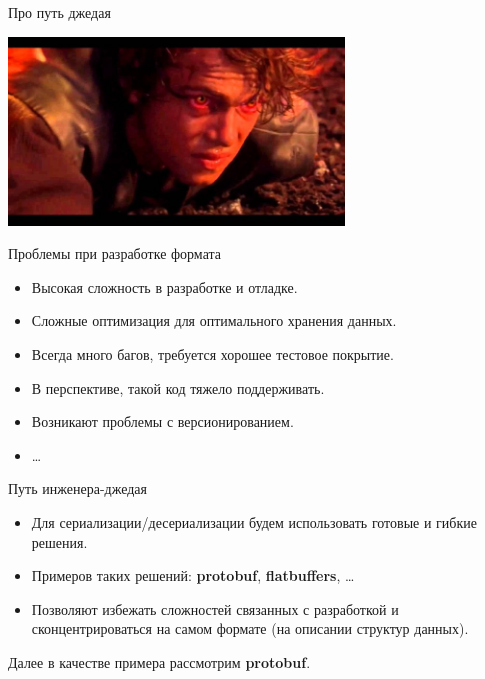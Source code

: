 \documentclass{beamer}
\begin{document}
\begin{frame}[fragile]{Про путь джедая}
    \begin{center}
        \includegraphics[height=50mm]{enaken.jpg}
    \end{center}
\end{frame}

\begin{frame}[fragile]{Проблемы при разработке формата}
    \begin{itemize}
        \item Высокая сложность в разработке и отладке.
        \item Сложные оптимизация для оптимального хранения данных.
        \item Всегда много багов, требуется хорошее тестовое покрытие.
        \item В перспективе, такой код тяжело поддерживать.
        \item Возникают проблемы с версионированием.
        \item \dots
    \end{itemize}
\end{frame}

\begin{frame}[fragile]{Путь инженера-джедая}
    \begin{itemize}
        \item Для сериализации/десериализации будем использовать готовые и гибкие решения.
        \item Примеров таких решений: {\bf protobuf}, {\bf flatbuffers}, \dots
        \item Позволяют избежать сложностей связанных с разработкой и сконцентрироваться на самом формате (на описании структур данных).
    \end{itemize}
    Далее в качестве примера рассмотрим {\bf protobuf}.
\end{frame}
\end{document}
